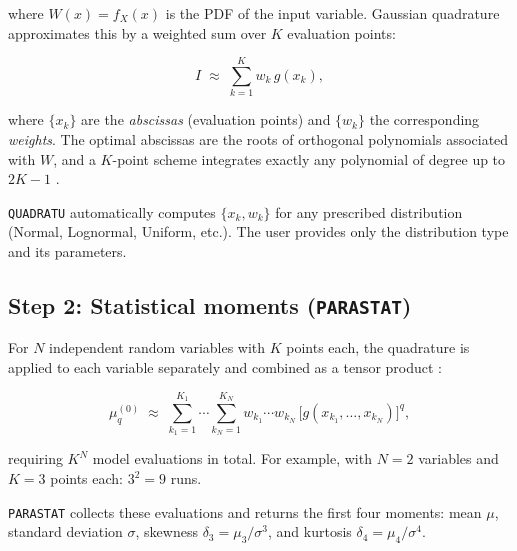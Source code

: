 where $W(x) = f_X(x)$ is the PDF of the input variable. Gaussian quadrature approximates this by a weighted sum over $K$ evaluation points:

\begin{equation}
    I \;\approx\; \sum_{k=1}^{K} w_k\, g(x_k),
    \label{eq:quad-1d}
\end{equation}

where $\{x_k\}$ are the \emph{abscissas} (evaluation points) and $\{w_k\}$ the corresponding \emph{weights}. The optimal abscissas are the roots of orthogonal polynomials associated with $W$, and a $K$-point scheme integrates exactly any polynomial of degree up to $2K - 1$ \cite{sudret2003}.

\texttt{QUADRATU} automatically computes $\{x_k, w_k\}$ for any prescribed distribution (Normal, Lognormal, Uniform, etc.). The user provides only the distribution type and its parameters.

\subsection{Step 2: Statistical moments (\texttt{PARASTAT})} \label{sec:quad-moments}

For $N$ independent random variables with $K$ points each, the quadrature is applied to each variable separately and combined as a tensor product \cite{sudret2003}:

\begin{equation}
    \mu_q^{(0)} \;\approx\;
    \sum_{k_1=1}^{K_1} \cdots \sum_{k_N=1}^{K_N}
    w_{k_1} \cdots w_{k_N}\,
    \bigl[g(x_{k_1}, \ldots, x_{k_N})\bigr]^q,
    \label{eq:moment-quadrature}
\end{equation}

requiring $K^N$ model evaluations in total. For example, with $N = 2$ variables and $K = 3$ points each: $3^2 = 9$ runs.

\texttt{PARASTAT} collects these evaluations and returns the first four moments: mean $\mu$, standard deviation $\sigma$, skewness $\delta_3 = \mu_3/\sigma^3$, and kurtosis $\delta_4 = \mu_4/\sigma^4$.

